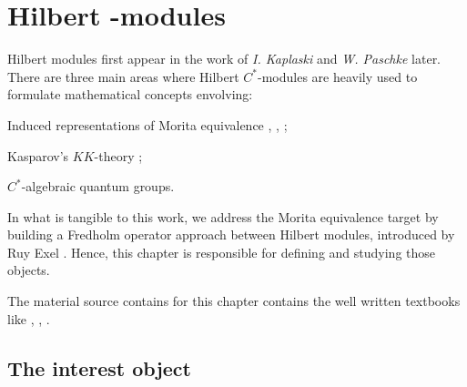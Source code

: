 \chapter[Hilbert \texorpdfstring{\ensuremath{C^*}}{C*}-modules]{Hilbert \texorpdfstring{}{C*}-modules}
\label{ch:hilbert modules}

Hilbert modules first appear in the work of \textit{I. Kaplaski} \cite{kaplansky1953modules} and \textit{W. Paschke} \cite{paschke1973inner} later. There are three main areas where Hilbert $C^*$-modules are heavily used to formulate mathematical concepts envolving:
\begin{itroman}
    \item\label{main areas (i)} Induced representations of Morita equivalence \cite{brown1977stable}, \cite{RIEFFEL1974176}, \cite{rieffel1981c};
    \item Kasparov's $KK$-theory \cite{kasparov1980stinespring};
    \item $C^*$-algebraic quantum groups.
\end{itroman}

In what is tangible to this work, we address the Morita equivalence target by building a Fredholm operator approach between Hilbert modules, introduced by Ruy Exel \cite{exel7fredholm}. Hence, this chapter is responsible for defining and studying those objects.

The material source contains for this chapter contains the well written textbooks like \cite{lance1995hilbert}, \cite{jensen2012elements}, \cite{manuilov2001hilbert}.

\section{The interest object}
\label{sec:definicao de hilbert c-star-modules}



